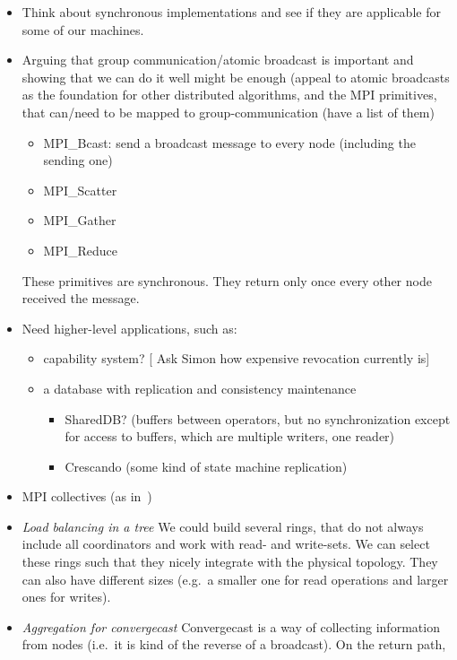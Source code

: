 \documentclass{article}
\newcommand{\stefan}[1]{
  {\color{skRed}[{\color{red}{SK}} #1]}}
\begin{document}
\begin{itemize}
\item Think about synchronous implementations and see if they are
  applicable for some of our machines.
\item Arguing that group communication/atomic broadcast is important
  and showing that we can do it well might be enough (appeal to atomic
  broadcasts as the foundation for other distributed algorithms, and
  the MPI primitives, that can/need to be mapped to
  group-communication (have a list of them)
  \begin{itemize}
  \item MPI_Bcast: send a broadcast message to every node (including
    the sending one)
  \item MPI_Scatter
  \item MPI_Gather
  \item MPI_Reduce
  \end{itemize}
  These primitives are synchronous. They return only once every other
  node received the message. 
\item Need higher-level applications, such as:
  \begin{itemize}
  \item capability system? \stefan{Ask Simon how expensive revocation
      currently is}
  \item a database with replication and consistency maintenance
    \begin{itemize}
    \item SharedDB? (buffers between operators, but no synchronization
      except for access to buffers, which are multiple writers, one
      reader)
    \item Crescando (some kind of state machine replication)
    \end{itemize}
  \end{itemize}
\item MPI collectives (as in~\cite{Tu2008})
\item \emph{Load balancing in a tree} We could build several rings,
  that do not always include all coordinators and work with read- and
  write-sets. We can select these rings such that they nicely
  integrate with the physical topology. They can also have different
  sizes (e.g.\ a smaller one for read operations and larger ones for
  writes).
\item \emph{Aggregation for convergecast} %
  Convergecast is a way of collecting information from nodes (i.e.\ it
  is kind of the reverse of a broadcast). On the return path,

\end{itemize}
\end{document}
